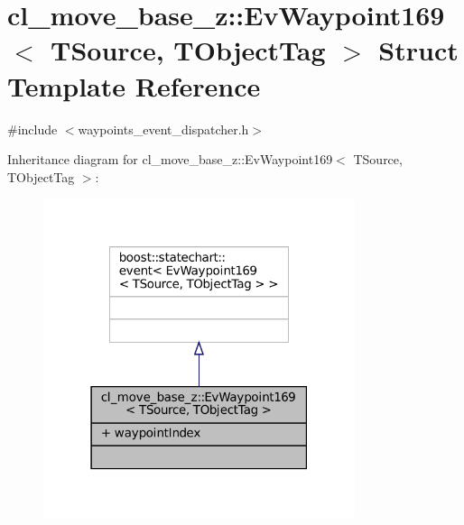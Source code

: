 \hypertarget{structcl__move__base__z_1_1EvWaypoint169}{}\section{cl\+\_\+move\+\_\+base\+\_\+z\+:\+:Ev\+Waypoint169$<$ T\+Source, T\+Object\+Tag $>$ Struct Template Reference}
\label{structcl__move__base__z_1_1EvWaypoint169}


{\ttfamily \#include $<$waypoints\+\_\+event\+\_\+dispatcher.\+h$>$}



Inheritance diagram for cl\+\_\+move\+\_\+base\+\_\+z\+:\+:Ev\+Waypoint169$<$ T\+Source, T\+Object\+Tag $>$\+:
\nopagebreak
\begin{figure}[H]
\begin{center}
\leavevmode
\includegraphics[width=259pt]{structcl__move__base__z_1_1EvWaypoint169__inherit__graph}
\end{center}
\end{figure}


